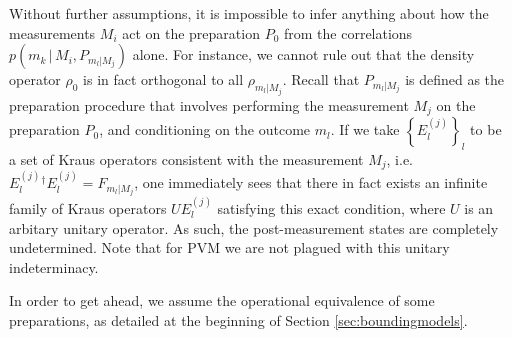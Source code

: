 Without further assumptions, it is impossible to infer anything about how the measurements $M_i$ act on the preparation $P_0$ from the correlations $p(m_k \, \vert \, M_i , P_{m_l\vert M_j} )$ alone. For instance, we cannot rule out that the density operator $\rho_0$ is in fact orthogonal to all $\rho_{m_l\vert M_j}$. Recall that $P_{m_l\vert M_j}$ is defined as the preparation procedure that involves performing the measurement $M_j$ on the preparation $P_0$, and conditioning on the outcome $m_l$. If we take $\left\{E_l^{(j)}\right\}_l$ to be a set of Kraus operators consistent with the measurement $M_j$, i.e. $E_l^{(j)}{}^{\dag}E_l^{(j)} = F_{m_l\vert M_j}$, one immediately sees that there in fact exists an infinite family of Kraus operators $UE_l^{(j)}$ satisfying this exact condition, where $U$ is an arbitary unitary operator. As such, the post-measurement states are completely undetermined.
Note that for PVM we are not plagued with this unitary indeterminacy. 

In order to get ahead, we assume the operational equivalence of some preparations, as detailed at the beginning of Section \ref{sec:boundingmodels}.


